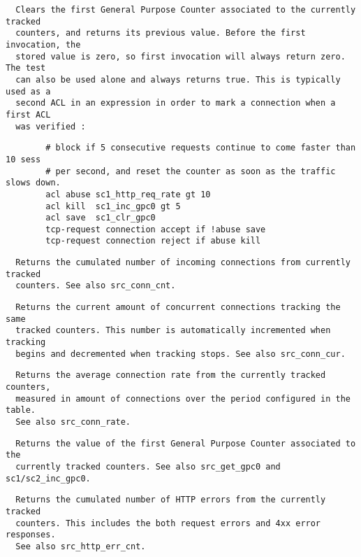 \begin{verbatim}
  Clears the first General Purpose Counter associated to the currently tracked
  counters, and returns its previous value. Before the first invocation, the
  stored value is zero, so first invocation will always return zero. The test
  can also be used alone and always returns true. This is typically used as a
  second ACL in an expression in order to mark a connection when a first ACL
  was verified :
\end{verbatim}

\begin{verbatim}
        # block if 5 consecutive requests continue to come faster than 10 sess
        # per second, and reset the counter as soon as the traffic slows down.
        acl abuse sc1_http_req_rate gt 10
        acl kill  sc1_inc_gpc0 gt 5
        acl save  sc1_clr_gpc0
        tcp-request connection accept if !abuse save
        tcp-request connection reject if abuse kill
\end{verbatim}

\begin{verbatim}
  Returns the cumulated number of incoming connections from currently tracked
  counters. See also src_conn_cnt.
\end{verbatim}

\begin{verbatim}
  Returns the current amount of concurrent connections tracking the same
  tracked counters. This number is automatically incremented when tracking
  begins and decremented when tracking stops. See also src_conn_cur.
\end{verbatim}

\begin{verbatim}
  Returns the average connection rate from the currently tracked counters,
  measured in amount of connections over the period configured in the table.
  See also src_conn_rate.
\end{verbatim}

\begin{verbatim}
  Returns the value of the first General Purpose Counter associated to the
  currently tracked counters. See also src_get_gpc0 and sc1/sc2_inc_gpc0.
\end{verbatim}

\begin{verbatim}
  Returns the cumulated number of HTTP errors from the currently tracked
  counters. This includes the both request errors and 4xx error responses.
  See also src_http_err_cnt.
\end{verbatim}

